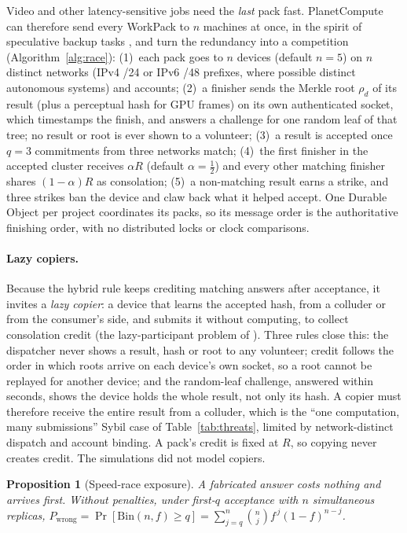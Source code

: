 \documentclass[11pt,a4paper]{article}
\theoremstyle{definition}
\theoremstyle{plain}
\newtheorem{proposition}{Proposition}[section]
\begin{document}
Video and other latency-sensitive jobs need the \emph{last} pack fast. PlanetCompute can therefore send every
WorkPack to $n$ machines at once, in the spirit of speculative backup tasks \citep{dean2004mapreduce}, and turn
the redundancy into a competition (Algorithm~\ref{alg:race}):
(1)~each pack goes to $n$ devices (default $n=5$) on $n$ distinct networks (IPv4 /24 or IPv6 /48 prefixes,
where possible distinct autonomous systems) and accounts; (2)~a finisher sends the Merkle root $\rho_d$ of its result (plus a perceptual hash for GPU frames) on its own
authenticated socket, which timestamps the finish, and answers a challenge for one random leaf of that tree;
no result or root is ever shown to a volunteer; (3)~a result is accepted once $q=3$
commitments from three networks match; (4)~the first finisher in the accepted cluster receives $\alpha R$
(default $\alpha=\tfrac12$) and every other matching finisher shares $(1-\alpha)R$ as consolation; (5)~a
non-matching result earns a strike, and three strikes ban the device and claw back what it helped accept. One
Durable Object per project coordinates its packs, so its message order is the authoritative finishing order,
with no distributed locks or clock comparisons.

\paragraph{Lazy copiers.} Because the hybrid rule keeps crediting matching answers after acceptance, it invites
a \emph{lazy copier}: a device that learns the accepted hash, from a colluder or from the consumer's side, and
submits it without computing, to collect consolation credit (the lazy-participant problem of
\citet{golle2001uncheatable}). Three rules close this: the dispatcher never shows a result, hash or root to any
volunteer; credit follows the order in which roots arrive on each device's own socket, so a root cannot be
replayed for another device; and the random-leaf challenge, answered within seconds, shows the device holds the
whole result, not only its hash. A copier must therefore receive the entire result from a colluder, which is the ``one computation,
many submissions'' Sybil case of Table~\ref{tab:threats}, limited by network-distinct dispatch and account
binding. A pack's credit is fixed at $R$, so copying never creates credit. The simulations did not model copiers.

\begin{proposition}[Speed-race exposure]\label{prop:speed}
A fabricated answer costs nothing and arrives first. Without penalties, under first-$q$ acceptance with $n$
simultaneous replicas, $P_{\text{wrong}} = \Pr[\mathrm{Bin}(n,f)\ge q] = \sum_{j=q}^{n}\binom{n}{j}f^{\,j}(1-f)^{n-j}$.
\end{proposition}
\end{document}
